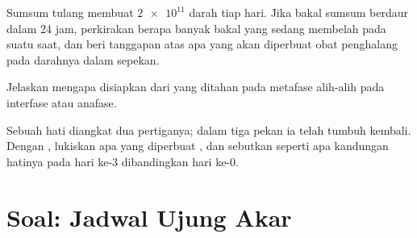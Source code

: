 \begin{exercise}[$\star\star\star$]\label{exo:g11:cell-cycle-mitosis:13}
Sumsum tulang membuat $\num{2e11}$  darah tiap hari. Jika  bakal
sumsum berdaur dalam 24 jam, perkirakan berapa banyak  bakal yang
sedang membelah pada suatu saat, dan beri tanggapan atas apa yang akan
diperbuat obat penghalang  pada darahnya dalam sepekan.
\end{exercise}

\begin{exercise}[$\star\star\star$]\label{exo:g11:cell-cycle-mitosis:14}
Jelaskan mengapa  disiapkan dari  yang ditahan pada
metafase alih-alih pada interfase atau anafase.
\end{exercise}

\begin{exercise}[$\star\star\star$]\label{exo:g11:cell-cycle-mitosis:15}
Sebuah hati diangkat dua pertiganya; dalam tiga pekan ia telah tumbuh
kembali. Dengan , lukiskan apa yang diperbuat , dan
sebutkan seperti apa kandungan   hatinya pada hari ke-3
dibandingkan hari ke-0.
\end{exercise}

\section{Soal: Jadwal Ujung Akar}

